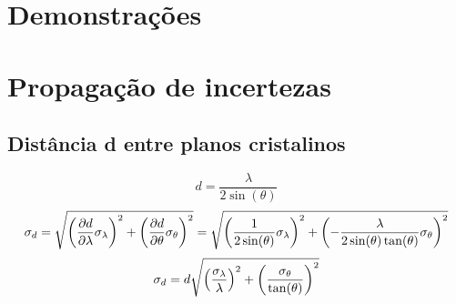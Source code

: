 \documentclass[article,12pt,openright,oneside,a4paper,brazil]{abntex2}
\begin{document}
\appendix

\newpage




\nocite{*}

\section{Demonstrações}

\section{Propagação de incertezas}

\subsection{Distância d entre planos cristalinos}
$$d=\frac{\lambda}{2\sin(\theta)}$$
$$\sigma_d=\sqrt{\qty(\pdv{d}{\lambda}\sigma_\lambda)^2+\qty(\pdv{d}{\theta}\sigma_\theta)^2}=\sqrt{\qty(\frac{1}{2\sin(\theta)}\sigma_\lambda)^2+\qty(-\frac{\lambda}{2\sin(\theta)\tan(\theta)}\sigma_\theta)^2}$$
$$\sigma_d=d\sqrt{\qty(\frac{\sigma_\lambda}{\lambda})^2+\qty(\frac{\sigma_\theta}{\tan(\theta)})^2}$$
\end{document}
